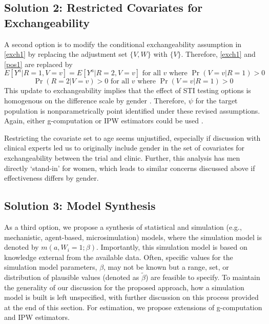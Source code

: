 \documentclass[]{article}
\begin{document}
\subsection*{Solution 2: Restricted Covariates for Exchangeability}

A second option is to modify the conditional exchangeability assumption in \ref{exch1} by replacing the adjustment set $\{V,W\}$ with $\{V\}$. Therefore, \ref{exch1} and \ref{pos1} are replaced by
\begin{equation}
	E[Y^a | R=1,V=v] = E[Y^a | R=2,V=v] \text{ for all } v \text{ where } \Pr(V=v | R=1) > 0
	\label{exch3}
\end{equation}
\begin{equation}
	\Pr(R=2 | V=v) > 0 \text{ for all } v \text{ where } \Pr(V=v | R=1) > 0
	\label{pos3}
\end{equation}
This update to exchangeability implies that the effect of STI testing options is homogenous on the difference scale by gender \cite{webster-clark_directed_2021}. Therefore, $\psi$ for the target population is nonparametrically point identified under these revised assumptions. Again, either g-computation or IPW estimators could be used \cite{westreich_transportability_2017, dahabreh_extending_2020}.

Restricting the covariate set to age seems unjustified, especially if discussion with clinical experts led us to originally include gender in the set of covariates for exchangeability between the trial and clinic. Further, this analysis has men directly `stand-in' for women, which leads to similar concerns discussed above if effectiveness differs by gender.

\subsection*{Solution 3: Model Synthesis}

As a third option, we propose a synthesis of statistical and simulation (e.g., mechanistic, agent-based, microsimulation) models, where the simulation model is denoted by $m(a,W_i=1;\beta)$. Importantly, this simulation model is based on knowledge external from the available data. Often, specific values for the simulation model parameters, $\beta$, may not be known but a range, set, or distribution of plausible values (denoted as $\tilde{\beta}$) are feasible to specify. To maintain the generality of our discussion for the proposed approach, how a simulation model is built is left unspecified, with further discussion on this process provided at the end of this section. For estimation, we propose extensions of g-computation and IPW estimators.
\end{document}
